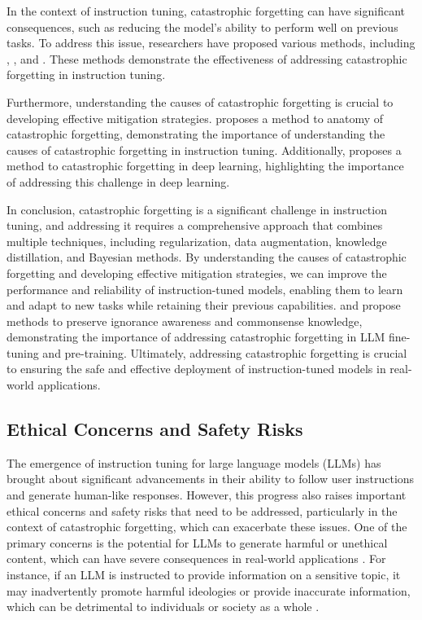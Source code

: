 \documentclass[11pt]{article}
\begin{document}
In the context of instruction tuning, catastrophic forgetting can have significant consequences, such as reducing the model's ability to perform well on previous tasks. To address this issue, researchers have proposed various methods, including \cite{ref110}, \cite{ref111}, and \cite{ref112}. These methods demonstrate the effectiveness of addressing catastrophic forgetting in instruction tuning.

Furthermore, understanding the causes of catastrophic forgetting is crucial to developing effective mitigation strategies. \cite{ref113} proposes a method to anatomy of catastrophic forgetting, demonstrating the importance of understanding the causes of catastrophic forgetting in instruction tuning. Additionally, \cite{ref114} proposes a method to catastrophic forgetting in deep learning, highlighting the importance of addressing this challenge in deep learning.

In conclusion, catastrophic forgetting is a significant challenge in instruction tuning, and addressing it requires a comprehensive approach that combines multiple techniques, including regularization, data augmentation, knowledge distillation, and Bayesian methods. By understanding the causes of catastrophic forgetting and developing effective mitigation strategies, we can improve the performance and reliability of instruction-tuned models, enabling them to learn and adapt to new tasks while retaining their previous capabilities. \cite{ref115} and \cite{ref116} propose methods to preserve ignorance awareness and commonsense knowledge, demonstrating the importance of addressing catastrophic forgetting in LLM fine-tuning and pre-training. Ultimately, addressing catastrophic forgetting is crucial to ensuring the safe and effective deployment of instruction-tuned models in real-world applications.

\subsection{Ethical Concerns and Safety Risks}

The emergence of instruction tuning for large language models (LLMs) has brought about significant advancements in their ability to follow user instructions and generate human-like responses. However, this progress also raises important ethical concerns and safety risks that need to be addressed, particularly in the context of catastrophic forgetting, which can exacerbate these issues. One of the primary concerns is the potential for LLMs to generate harmful or unethical content, which can have severe consequences in real-world applications \cite{ref117}. For instance, if an LLM is instructed to provide information on a sensitive topic, it may inadvertently promote harmful ideologies or provide inaccurate information, which can be detrimental to individuals or society as a whole \cite{ref118}.
\end{document}
